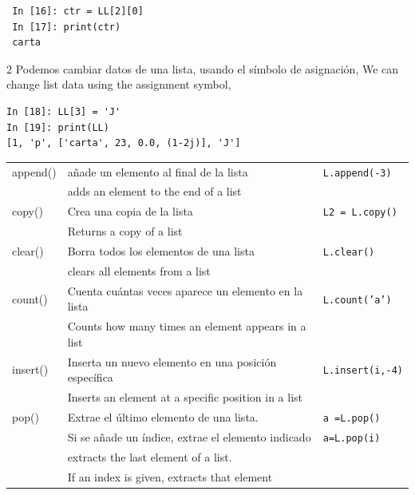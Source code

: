 \begin{center}
\begin{minipage}{0.3\textwidth}
 \begin{verbatim}
 In [16]: ctr = LL[2][0]
 In [17]: print(ctr)
 carta
\end{verbatim}
\end{minipage}
\end{center}
\begin{paracol}{2}
Podemos cambiar datos de una lista, usando el símbolo de asignación,
\switchcolumn
We can change list data using the assignment symbol,
\end{paracol}
\begin{center}
\begin{minipage}{0.5\textwidth}
\begin{verbatim}
In [18]: LL[3] = 'J'
In [19]: print(LL)
[1, 'p', ['carta', 23, 0.0, (1-2j)], 'J']
\end{verbatim}
\end{minipage}
\end{center}

\begin{table}
\centering
    \begin{tabular}{l l l}
    append() & añade un elemento al final de la lista & \texttt{L.append(-3)}\\
    & adds an element to the end of a list & \\
    \hline
    copy() & Crea una copia de la lista & \texttt{L2 = L.copy()}\\
    & Returns a copy of a list & \\
    \hline
     clear() & Borra todos los elementos de una lista & \texttt{L.clear()}\\
     &clears all elements from a list&\\
     \hline
     count()& Cuenta cuántas veces aparece un elemento en la lista & \texttt{L.count('a')}\\
     &Counts how many times an element appears in a list&\\
     \hline
     insert() & Inserta un nuevo elemento en una posición específica & \texttt{L.insert(i,-4)}\\
     &Inserts an element at a specific position in a list &\\
     \hline
     pop() & Extrae el último elemento de una lista.  &\texttt{a =L.pop()}\\
     & Si se añade un índice, extrae el elemento indicado &\texttt{a=L.pop(i)}\\
     & extracts the last element of a list. &\\
     &If an index is given, extracts that element& \\
     \hline
    \end{tabular}
    \label{Tb:listas}
\end{table}

